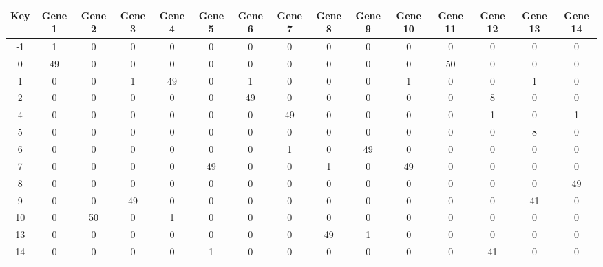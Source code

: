 \begin{tabular}{|c|c|c|c|c|c|c|c|c|c|c|c|c|c|c|}
\hline
Key & Gene 1 & Gene 2 & Gene 3 & Gene 4 & Gene 5 & Gene 6 & Gene 7 & Gene 8 & Gene 9 & Gene 10 & Gene 11 & Gene 12 & Gene 13 & Gene 14 \\
\hline
-1 & 1 & 0 & 0 & 0 & 0 & 0 & 0 & 0 & 0 & 0 & 0 & 0 & 0 & 0 \\
0 & 49 & 0 & 0 & 0 & 0 & 0 & 0 & 0 & 0 & 0 & 50 & 0 & 0 & 0 \\
1 & 0 & 0 & 1 & 49 & 0 & 1 & 0 & 0 & 0 & 1 & 0 & 0 & 1 & 0 \\
2 & 0 & 0 & 0 & 0 & 0 & 49 & 0 & 0 & 0 & 0 & 0 & 8 & 0 & 0 \\
4 & 0 & 0 & 0 & 0 & 0 & 0 & 49 & 0 & 0 & 0 & 0 & 1 & 0 & 1 \\
5 & 0 & 0 & 0 & 0 & 0 & 0 & 0 & 0 & 0 & 0 & 0 & 0 & 8 & 0 \\
6 & 0 & 0 & 0 & 0 & 0 & 0 & 1 & 0 & 49 & 0 & 0 & 0 & 0 & 0 \\
7 & 0 & 0 & 0 & 0 & 49 & 0 & 0 & 1 & 0 & 49 & 0 & 0 & 0 & 0 \\
8 & 0 & 0 & 0 & 0 & 0 & 0 & 0 & 0 & 0 & 0 & 0 & 0 & 0 & 49 \\
9 & 0 & 0 & 49 & 0 & 0 & 0 & 0 & 0 & 0 & 0 & 0 & 0 & 41 & 0 \\
10 & 0 & 50 & 0 & 1 & 0 & 0 & 0 & 0 & 0 & 0 & 0 & 0 & 0 & 0 \\
13 & 0 & 0 & 0 & 0 & 0 & 0 & 0 & 49 & 1 & 0 & 0 & 0 & 0 & 0 \\
14 & 0 & 0 & 0 & 0 & 1 & 0 & 0 & 0 & 0 & 0 & 0 & 41 & 0 & 0 \\
\hline
\end{tabular}